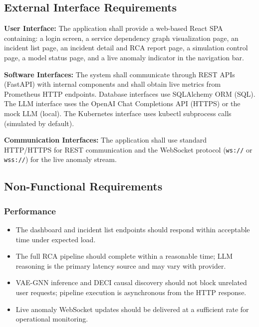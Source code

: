 \documentclass[11pt,a4paper]{article}
\begin{document}

\subsection{External Interface Requirements}

\textbf{User Interface:}
The application shall provide a web-based React SPA containing: a login screen, a service dependency graph visualization page, an incident list page, an incident detail and RCA report page, a simulation control page, a model status page, and a live anomaly indicator in the navigation bar.

\textbf{Software Interfaces:}
The system shall communicate through REST APIs (FastAPI) with internal components and shall obtain live metrics from Prometheus HTTP endpoints. Database interfaces use SQLAlchemy ORM (SQL). The LLM interface uses the OpenAI Chat Completions API (HTTPS) or the mock LLM (local). The Kubernetes interface uses kubectl subprocess calls (simulated by default).

\textbf{Communication Interfaces:}
The application shall use standard HTTP/HTTPS for REST communication and the WebSocket protocol (\texttt{ws://} or \texttt{wss://}) for the live anomaly stream.


\subsection{Non-Functional Requirements}

\subsubsection{Performance}
\begin{itemize}
    \item The dashboard and incident list endpoints should respond within acceptable time under expected load.
    \item The full RCA pipeline should complete within a reasonable time; LLM reasoning is the primary latency source and may vary with provider.
    \item VAE-GNN inference and DECI causal discovery should not block unrelated user requests; pipeline execution is asynchronous from the HTTP response.
    \item Live anomaly WebSocket updates should be delivered at a sufficient rate for operational monitoring.
\end{itemize}
\end{document}
